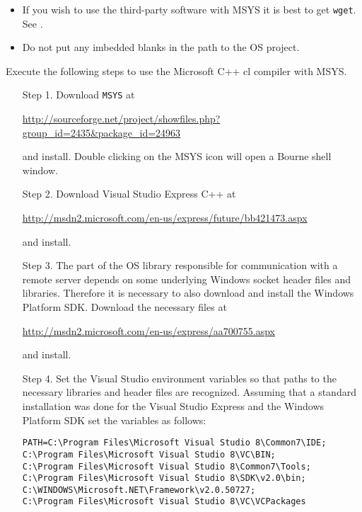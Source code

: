 \documentclass[11pt]{article}
\renewcommand{\_}{{\char"5F}}
\renewcommand{\{}{{\char"7B}}
\renewcommand{\}}{{\char"7D}}
\renewcommand{\^}{{\char"0D}}
\renewcommand{\'}{{\char"0D}}
\begin{document}
\vskip 8pt


\begin{itemize}

\item If you wish to use the third-party software with MSYS it is best to get {\tt wget}. See \pageref{section:windowsintall}.

 \item Do not put any imbedded blanks in the path to the OS project.
 \end{itemize}



Execute the following steps to use the Microsoft C++ cl compiler with MSYS.


\begin{itemize}

\item[Step 1.] Download {\tt MSYS} at

\begin{center}
\url{http://sourceforge.net/project/showfiles.php?group_id=2435&package_id=24963}
\end{center}

and install.  Double clicking on the MSYS icon will open a Bourne shell window.

\item[Step 2.]  Download  Visual Studio Express C++ at

 \url{http://msdn2.microsoft.com/en-us/express/future/bb421473.aspx}

and install.

 \item[Step 3.]  The part of the OS library responsible for communication with a remote server depends on some underlying Windows socket header files and libraries. Therefore it is necessary to also download and install the Windows Platform SDK. Download the necessary files at

 \url{http://msdn2.microsoft.com/en-us/express/aa700755.aspx}

 and install.

\item[Step 4.]   Set the Visual Studio environment variables so that paths to the necessary libraries and header files  are recognized.  Assuming that a standard installation was done for the Visual Studio Express and the Windows Platform SDK set the variables as follows:

\begin{verbatim}
PATH=C:\Program Files\Microsoft Visual Studio 8\Common7\IDE;
C:\Program Files\Microsoft Visual Studio 8\VC\BIN;
C:\Program Files\Microsoft Visual Studio 8\Common7\Tools;
C:\Program Files\Microsoft Visual Studio 8\SDK\v2.0\bin;
C:\WINDOWS\Microsoft.NET\Framework\v2.0.50727;
C:\Program Files\Microsoft Visual Studio 8\VC\VCPackages



\end{verbatim}
\end{itemize}
\end{document}
